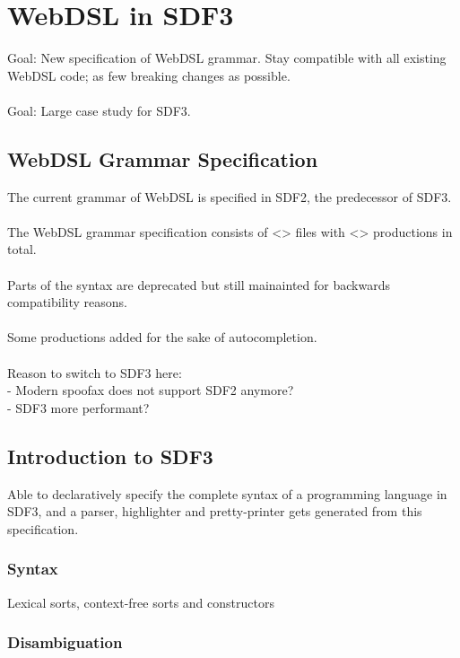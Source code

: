 
\chapter{\label{chap:sdf3}WebDSL in SDF3}

  Goal: New specification of WebDSL grammar. Stay compatible with all existing WebDSL code; as few breaking changes as possible.
  \\\\Goal: Large case study for SDF3.

  \section{WebDSL Grammar Specification}

    The current grammar of WebDSL is specified in SDF2, the predecessor of SDF3.
    \\\\The WebDSL grammar specification consists of <> files with <> productions in total.
    \\\\Parts of the syntax are deprecated but still mainainted for backwards compatibility reasons.
    \\\\Some productions added for the sake of autocompletion.
    \\\\Reason to switch to SDF3 here:
    \\- Modern spoofax does not support SDF2 anymore?
    \\- SDF3 more performant?

  \section{Introduction to SDF3}

    Able to declaratively specify the complete syntax of a programming language in SDF3, and a parser, highlighter and pretty-printer gets generated from this specification.

    \subsection{Syntax}

      Lexical sorts, context-free sorts and constructors

    \subsection{Disambiguation}

